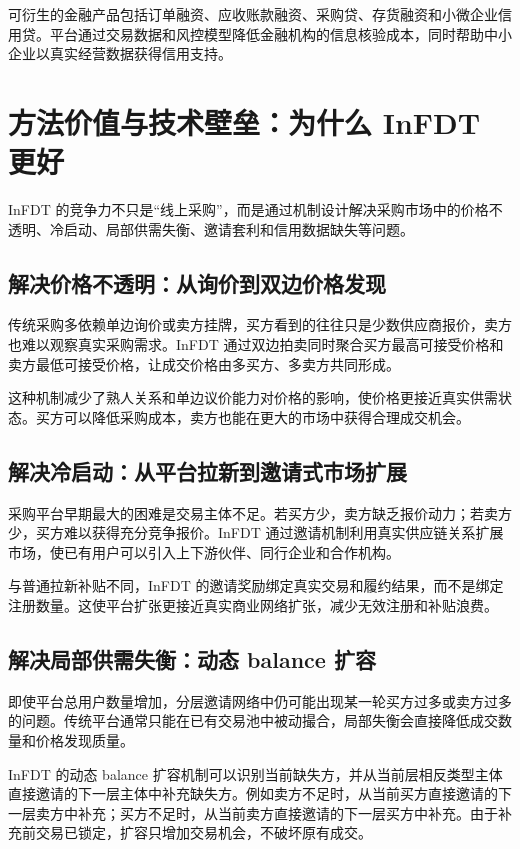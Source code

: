 \documentclass[UTF8,11pt]{ctexart}
\begin{document}
可衍生的金融产品包括订单融资、应收账款融资、采购贷、存货融资和小微企业信用贷。平台通过交易数据和风控模型降低金融机构的信息核验成本，同时帮助中小企业以真实经营数据获得信用支持。

\section{方法价值与技术壁垒：为什么 InFDT 更好}

InFDT 的竞争力不只是“线上采购”，而是通过机制设计解决采购市场中的价格不透明、冷启动、局部供需失衡、邀请套利和信用数据缺失等问题。

\subsection{解决价格不透明：从询价到双边价格发现}

传统采购多依赖单边询价或卖方挂牌，买方看到的往往只是少数供应商报价，卖方也难以观察真实采购需求。InFDT 通过双边拍卖同时聚合买方最高可接受价格和卖方最低可接受价格，让成交价格由多买方、多卖方共同形成。

这种机制减少了熟人关系和单边议价能力对价格的影响，使价格更接近真实供需状态。买方可以降低采购成本，卖方也能在更大的市场中获得合理成交机会。

\subsection{解决冷启动：从平台拉新到邀请式市场扩展}

采购平台早期最大的困难是交易主体不足。若买方少，卖方缺乏报价动力；若卖方少，买方难以获得充分竞争报价。InFDT 通过邀请机制利用真实供应链关系扩展市场，使已有用户可以引入上下游伙伴、同行企业和合作机构。

与普通拉新补贴不同，InFDT 的邀请奖励绑定真实交易和履约结果，而不是绑定注册数量。这使平台扩张更接近真实商业网络扩张，减少无效注册和补贴浪费。

\subsection{解决局部供需失衡：动态 balance 扩容}

即使平台总用户数量增加，分层邀请网络中仍可能出现某一轮买方过多或卖方过多的问题。传统平台通常只能在已有交易池中被动撮合，局部失衡会直接降低成交数量和价格发现质量。

InFDT 的动态 balance 扩容机制可以识别当前缺失方，并从当前层相反类型主体直接邀请的下一层主体中补充缺失方。例如卖方不足时，从当前买方直接邀请的下一层卖方中补充；买方不足时，从当前卖方直接邀请的下一层买方中补充。由于补充前交易已锁定，扩容只增加交易机会，不破坏原有成交。
\end{document}
